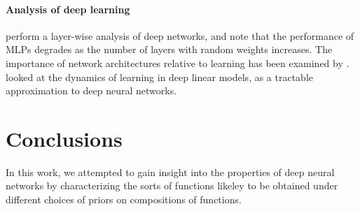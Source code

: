 \documentclass[twoside]{article}
\newcommand{\sectiondist}{}
\begin{document}
\paragraph{Analysis of deep learning}
\cite{montavon2010layer} perform a layer-wise analysis of deep networks, and note that the performance of MLPs degrades as the number of layers with random weights increases.
The importance of network architectures relative to learning has been examined by \cite{saxe2011random}.
\cite{saxedynamics} looked at the dynamics of learning in deep linear models, as a tractable approximation to deep neural networks.  











\section{Conclusions}
\sectiondist


In this work, we attempted to gain insight into the properties of deep neural networks by characterizing the sorts of functions likeley to be obtained under different choices of priors on compositions of functions.
\end{document}
